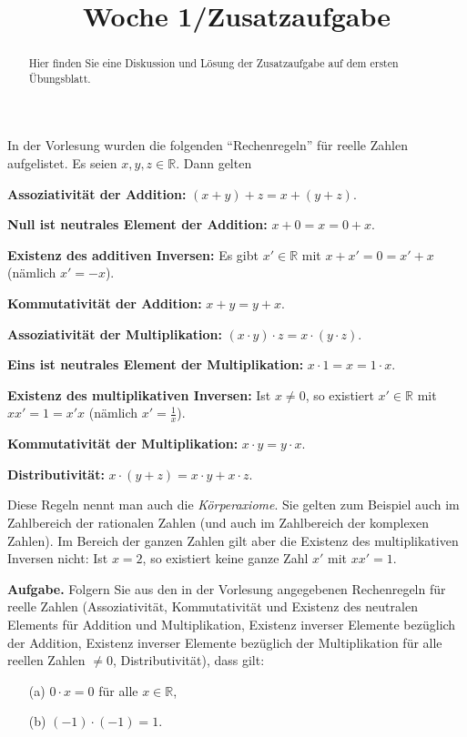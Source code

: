 \documentclass{ximera}
\title{Woche 1/Zusatzaufgabe}
\begin{document}
\begin{abstract}
Hier finden Sie eine Diskussion und Lösung der Zusatzaufgabe auf dem ersten Übungsblatt.
\end{abstract}
\maketitle

In der Vorlesung wurden die folgenden ``Rechenregeln'' für reelle Zahlen aufgelistet. Es seien $x, y, z\in \mathbb R$. Dann gelten

\textbf{Assoziativität der Addition:}
$(x+y) + z = x + (y+z)$.

\textbf{Null ist neutrales Element der Addition:}
$x +0 = x = 0 + x$.

\textbf{Existenz des additiven Inversen:}
Es gibt $x'\in \mathbb R$ mit $x+x' = 0 = x'+x$ (nämlich $x'=-x$).

\textbf{Kommutativität der Addition:}
$x + y = y + x$.

\textbf{Assoziativität der Multiplikation:}
$(x\cdot y)\cdot z = x\cdot (y\cdot z)$.

\textbf{Eins ist neutrales Element der Multiplikation:}
$x\cdot 1 = x = 1\cdot x$.

\textbf{Existenz des multiplikativen Inversen:}
Ist $x\ne 0$, so existiert $x'\in \mathbb R$ mit $xx' = 1 = x'x$ (nämlich $x'=\frac 1x$).

\textbf{Kommutativität der Multiplikation:}
$x\cdot y = y\cdot x$.

\textbf{Distributivität:}
$x\cdot (y+z) = x\cdot y + x\cdot z$.

Diese Regeln nennt man auch die \emph{Körperaxiome}. Sie gelten zum Beispiel auch im Zahlbereich der rationalen Zahlen (und auch im Zahlbereich der komplexen Zahlen). Im Bereich der ganzen Zahlen gilt aber die Existenz des multiplikativen Inversen nicht: Ist $x=2$, so existiert keine ganze Zahl $x'$ mit $xx'=1$.


\textbf{Aufgabe.}
Folgern Sie aus den in der Vorlesung angegebenen Rechenregeln für reelle Zahlen (Assoziativität, Kommutativität und Existenz des neutralen Elements für Addition und Multiplikation, Existenz inverser Elemente bezüglich der Addition, Existenz inverser Elemente bezüglich der Multiplikation für alle reellen Zahlen $\ne 0$, Distributivität), dass gilt:
\begin{enumerate}
\item[(a)]
$0\cdot x = 0$ für alle $x\in \mathbb R$,
\item[(b)]
$(-1) \cdot (-1) = 1$.
\end{enumerate}
\end{document}
